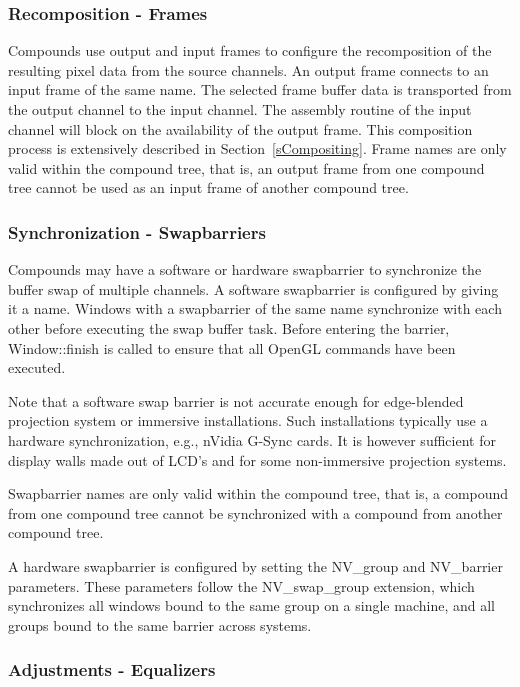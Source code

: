 \documentclass[10pt,a4]{scrartcl}
\newcommand{\sref}[1]{Section~\ref{#1}}
\begin{document}
\subsubsection{Recomposition - Frames}
Compounds use output and input frames to configure the recomposition of
the resulting pixel data from the source channels. An output frame
connects to an input frame of the same name. The selected frame buffer
data is transported from the output channel to the input channel. The
assembly routine of the input channel will block on the availability of
the output frame. This composition process is extensively described in
\sref{sCompositing}. Frame names are only valid within the compound
tree, that is, an output frame from one compound tree cannot be used as
an input frame of another compound tree.

\subsubsection{\label{sSwapBarrier}Synchronization - Swapbarriers}
Compounds may have a software or hardware swapbarrier to synchronize the
buffer swap of multiple channels. A software swapbarrier is configured
by giving it a name. Windows with a swapbarrier of the same name
synchronize with each other before executing the swap buffer
task. Before entering the barrier, \textsf{Window::finish} is called to
ensure that all OpenGL commands have been executed.

Note that a software swap barrier is not accurate enough for
edge-blended projection system or immersive installations. Such
installations typically use a hardware synchronization, e.g., nVidia
G-Sync cards. It is however sufficient for display walls made out of
LCD's and for some non-immersive projection systems.

Swapbarrier names are only valid within the compound tree, that is, a
compound from one compound tree cannot be synchronized with a compound
from another compound tree.

A hardware swapbarrier is configured by setting the \textsf{NV\_group}
and \textsf{NV\_barrier} parameters. These parameters follow the
\textsf{NV\_swap\_group} extension, which synchronizes all windows bound
to the same group on a single machine, and all groups bound to the same
barrier across systems.

\subsubsection{\label{sEqualizers}Adjustments - Equalizers}
\end{document}
